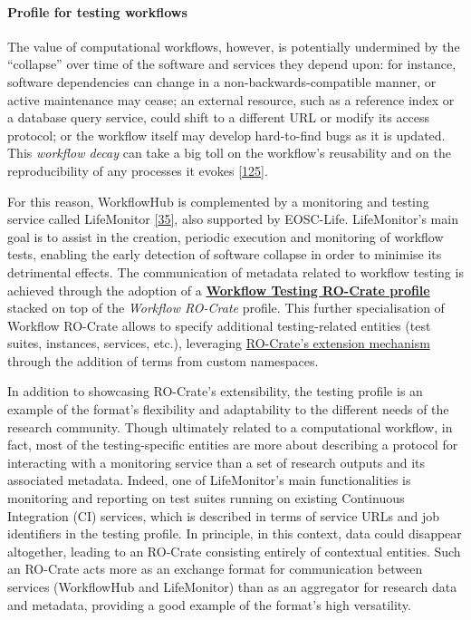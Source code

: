 \hypertarget{profile-for-testing-workflows}{%
\paragraph{Profile for testing
workflows}\label{profile-for-testing-workflows}}

The value of computational workflows, however, is potentially undermined
by the ``collapse'' over time of the software and services they depend
upon: for instance, software dependencies can change in a
non-backwards-compatible manner, or active maintenance may cease; an
external resource, such as a reference index or a database query
service, could shift to a different URL or modify its access protocol;
or the workflow itself may develop hard-to-find bugs as it is updated.
This \emph{workflow decay} can take a big toll on the workflow's
reusability and on the reproducibility of any processes it evokes
{[}\href{https://www.research.manchester.ac.uk/portal/files/174861334/why_decay.pdf}{125}{]}.

For this reason, WorkflowHub is complemented by a monitoring and testing
service called LifeMonitor
\href{https://about.lifemonitor.eu/}{{[}35{]}}, also supported by
EOSC-Life. LifeMonitor's main goal is to assist in the creation,
periodic execution and monitoring of workflow tests, enabling the early
detection of software collapse in order to minimise its detrimental
effects. The communication of metadata related to workflow testing is
achieved through the adoption of a
\href{https://lifemonitor.eu/workflow_testing_ro_crate}{\textbf{Workflow
Testing RO-Crate profile}} stacked on top of the \emph{Workflow
RO-Crate} profile. This further specialisation of Workflow RO-Crate
allows to specify additional testing-related entities (test suites,
instances, services, etc.), leveraging
\href{https://www.researchobject.org/ro-crate/1.1/appendix/jsonld.html\#extending-ro-crate}{RO-Crate's
extension mechanism} through the addition of terms from custom
namespaces.

In addition to showcasing RO-Crate's extensibility, the testing profile
is an example of the format's flexibility and adaptability to the
different needs of the research community. Though ultimately related to
a computational workflow, in fact, most of the testing-specific entities
are more about describing a protocol for interacting with a monitoring
service than a set of research outputs and its associated metadata.
Indeed, one of LifeMonitor's main functionalities is monitoring and
reporting on test suites running on existing Continuous Integration (CI)
services, which is described in terms of service URLs and job
identifiers in the testing profile. In principle, in this context, data
could disappear altogether, leading to an RO-Crate consisting entirely
of contextual entities. Such an RO-Crate acts more as an exchange format
for communication between services (WorkflowHub and LifeMonitor) than as
an aggregator for research data and metadata, providing a good example
of the format's high versatility.

